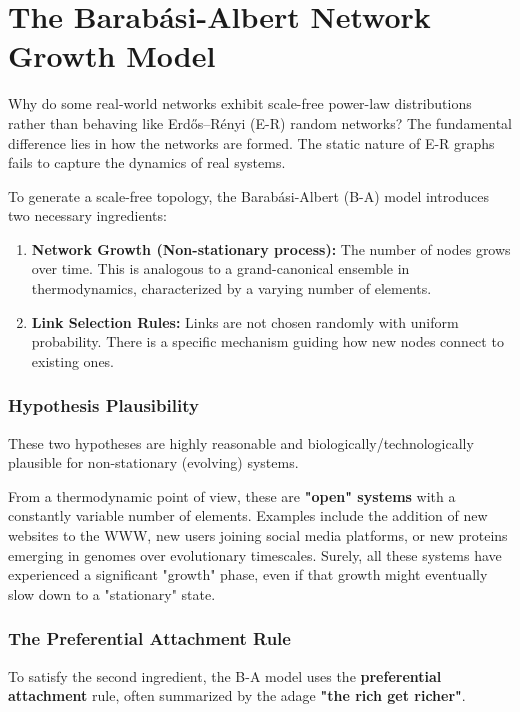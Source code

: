 \section{The Barabási-Albert Network Growth Model}

Why do some real-world networks exhibit scale-free power-law distributions rather than behaving like Erdős–Rényi (E-R) random networks? The fundamental difference lies in how the networks are formed. The static nature of E-R graphs fails to capture the dynamics of real systems.

To generate a scale-free topology, the Barabási-Albert (B-A) model introduces two necessary ingredients:
\begin{enumerate}
    \item \textbf{Network Growth (Non-stationary process):} The number of nodes grows over time. This is analogous to a grand-canonical ensemble in thermodynamics, characterized by a varying number of elements.
    \item \textbf{Link Selection Rules:} Links are not chosen randomly with uniform probability. There is a specific mechanism guiding how new nodes connect to existing ones.
\end{enumerate}

\subsubsection{Hypothesis Plausibility}

These two hypotheses are highly reasonable and biologically/technologically plausible for non-stationary (evolving) systems.

From a thermodynamic point of view, these are \textbf{"open" systems} with a constantly variable number of elements. Examples include the addition of new websites to the WWW, new users joining social media platforms, or new proteins emerging in genomes over evolutionary timescales. Surely, all these systems have experienced a significant "growth" phase, even if that growth might eventually slow down to a "stationary" state.

\subsubsection{The Preferential Attachment Rule}

To satisfy the second ingredient, the B-A model uses the \textbf{preferential attachment} rule, often summarized by the adage \textbf{"the rich get richer"}.

